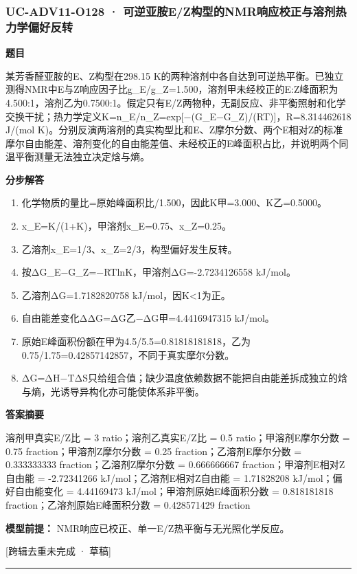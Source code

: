 \documentclass[UTF8,11pt,a4paper]{ctexart}
\begin{document}
\subsubsection*{UC-ADV11-O128 · 可逆亚胺E/Z构型的NMR响应校正与溶剂热力学偏好反转}
\noindent\textbf{题目}\par
某芳香醛亚胺的E、Z构型在298.15 K的两种溶剂中各自达到可逆热平衡。已独立测得NMR中E与Z响应因子比g\_E/g\_Z=1.500，溶剂甲未经校正的E:Z峰面积为4.500:1，溶剂乙为0.7500:1。假定只有E/Z两物种，无副反应、非平衡照射和化学交换干扰；热力学定义K=n\_E/n\_Z=exp[−(G\_E−G\_Z)/(RT)]，R=8.314462618 J/(mol K)。分别反演两溶剂的真实构型比和E、Z摩尔分数、两个E相对Z的标准摩尔自由能差、溶剂变化的自由能差值、未经校正的E峰面积占比，并说明两个同温平衡测量无法独立决定焓与熵。\par
\medskip\noindent\textbf{分步解答}
\begin{enumerate}
\item 化学物质的量比=原始峰面积比/1.500，因此K甲=3.000、K乙=0.5000。
\item x\_E=K/(1+K)，甲溶剂x\_E=0.75、x\_Z=0.25。
\item 乙溶剂x\_E=1/3、x\_Z=2/3，构型偏好发生反转。
\item 按ΔG\_E−G\_Z=−RTlnK，甲溶剂ΔG=-2.7234126558 kJ/mol。
\item 乙溶剂ΔG=1.7182820758 kJ/mol，因K<1为正。
\item 自由能差变化ΔΔG=ΔG乙−ΔG甲=4.4416947315 kJ/mol。
\item 原始E峰面积份额在甲为4.5/5.5=0.81818181818，乙为0.75/1.75=0.42857142857，不同于真实摩尔分数。
\item ΔG=ΔH−TΔS只给组合值；缺少温度依赖数据不能把自由能差拆成独立的焓与熵，光诱导异构化亦可能使体系非平衡。
\end{enumerate}
\noindent\textbf{答案摘要}\par
溶剂甲真实E/Z比 = 3 ratio；溶剂乙真实E/Z比 = 0.5 ratio；甲溶剂E摩尔分数 = 0.75 fraction；甲溶剂Z摩尔分数 = 0.25 fraction；乙溶剂E摩尔分数 = 0.333333333 fraction；乙溶剂Z摩尔分数 = 0.666666667 fraction；甲溶剂E相对Z自由能 = -2.72341266 kJ/mol；乙溶剂E相对Z自由能 = 1.71828208 kJ/mol；偏好自由能变化 = 4.44169473 kJ/mol；甲溶剂原始E峰面积分数 = 0.818181818 fraction；乙溶剂原始E峰面积分数 = 0.428571429 fraction\par
\noindent\textbf{模型前提：}
NMR响应已校正、单一E/Z热平衡与无光照化学反应。\par
\noindent\textcolor{red!65!black}{[跨辑去重未完成 · 草稿]} \par
\medskip\hrule\medskip
{}
\end{document}
